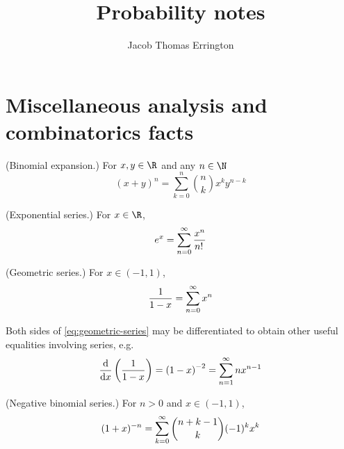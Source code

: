 \documentclass[11pt]{article}
\author{Jacob Thomas Errington}
\title{Probability notes}
\date{}
\begin{document}
\maketitle

\section{Miscellaneous analysis and combinatorics facts}

\begin{thm}{(Binomial expansion.)}
    \label{thm:binomial-expansion}
    For $x, y \in \R$ and any $n \in \N$
    \begin{equation}
        \label{eq:binomial-expansion}
        (x + y)^n = \sum_{k=0}^n {
            \binom{n}{k} x^k y^{n -k}
        }
    \end{equation}
\end{thm}

\begin{thm}{(Exponential series.)}
    \label{thm:exponential-series}
    For $x \in \R$,
    \begin{equation}
        \label{eq:series-ex}
        e^x = \sum^\infty_{n=0} {
            \frac{x^n}{n!\,}
        }
    \end{equation}
\end{thm}

\begin{thm}{(Geometric series.)}
    \label{thm:geometric-series}
    For $x \in (-1, 1)$,
    \begin{equation}
        \label{eq:geometric-series}
        \frac{1}{1 - x} = \sum^\infty_{n=0} { x^n }
    \end{equation}
\end{thm}

\begin{rem}
    \label{rem:differentiate-geometric-series}
    Both sides of \eqref{eq:geometric-series} may be differentiated to obtain
    other useful equalities involving series, e.g.
    \begin{equation*}
        \frac{\mathrm{d} }{\mathrm{d} x}\left( \frac{1}{1-x} \right)
        =
        \left(1-x\right)^{-2}
        =
        \sum^\infty_{n=1} { n x^{n-1} }
    \end{equation*}
\end{rem}

\begin{thm}{(Negative binomial series.)}
    \label{thm:negative-binomial-series}
    For $n > 0$ and $x \in (-1, 1)$,
    \begin{equation}
        \label{eq:negative-binomial-series}
        (1+x)^{-n} = \sum^\infty_{k=0} {
            \binom{n + k - 1}{k} (-1)^k x^k
        }
    \end{equation}
\end{thm}
\end{document}
